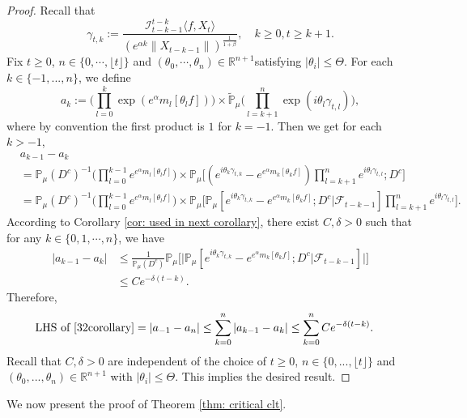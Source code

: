 \documentclass[12pt,a4paper]{amsart}
\theoremstyle{plain}
\theoremstyle{definition}
\numberwithin{equation}{section}
\begin{document}
\begin{proof}
    Recall that \[\gamma_{t,k}:=\frac {\mathcal I_{t-k-1}^{t-k}\langle f ,X_t\rangle}{(e^{\alpha k}\|X_{t-k-1}\|)^\frac{1}{1+\beta}},\quad k \geq 0, t\geq k+1. \]
    Fix $t\geq 0$, $n \in \{0, \cdots, \lfloor t \rfloor\}$ and $(\theta_0, \cdots, \theta_n)\in \mathbb R^{n+1}$satisfying $|\theta_i|\leq \Theta$.
    For each $k\in\{-1,...,n\}$, we define
\[
    a_k
    :=\Big(\prod_{l=0}^{k}\exp(e^{\alpha}m_l[\theta_lf])\Big) \times \mathbb{\tilde{P}}_{\mu}\Big(\prod_{l=k+1}^{n}\exp\left(i\theta_l\gamma_{t,l}\right)\Big),
\]
    where by convention the first product is $1$ for $k=-1$. Then we get for each $k > -1$,
\begin{align}
    &a_{k-1} - a_k
    \\&=\mathbb{P}_{\mu}(D^c)^{-1}\Big(\prod_{l=0}^{k-1}e^{e^{\alpha}m_l[\theta_l f]}\Big) \times \mathbb{P}_{\mu}\Big[(e^{i\theta_{k}\gamma_{t,k}}-e^{e^{\alpha}m_k[\theta_k f]})\prod_{l=k+1}^ne^{i\theta_{l}\gamma_{t,l}};D^c\Big]
    \\&=\mathbb{P}_{\mu}(D^c)^{-1} \Big(\prod_{l=0}^{k-1}e^{e^{\alpha}m_l[\theta_l f]}\Big) \times \mathbb{P}_{\mu}\Big[\mathbb P_\mu[e^{i\theta_{k}\gamma_{t,k}}-e^{e^{\alpha}m_k[\theta_k f]}; D^c|\mathscr F_{t-k-1}]\prod_{l=k+1}^ne^{i\theta_{l}\gamma_{t,l}}\Big].
\end{align}
    According to Corollary \ref{cor: used in next corollary}, there exist $C,\delta>0$ such that for any $k\in\{0, 1, \cdots, n\}$, we have
\begin{align}
    |a_{k-1}- a_k|
    &\leq \frac{1}{\mathbb{P}_{\mu}(D^c)}\mathbb{P}_{\mu}\Big[\big|\mathbb P_\mu[e^{i\theta_{k}\gamma_{t,k}}-e^{e^{\alpha}m_k[\theta_k f]}; D^c\big|\mathscr{F}_{t-k-1}]\big|\Big]
    \\& \leq C e^{-\delta(t-k)}.
\end{align}
    Therefore,
\begin{align}
    \text{LHS of \eqref{32corollary}}&= \left|a_{-1}-a_n\right|
    \leq\sum_{k=0}^n\left|a_{k-1}-a_k\right|
    \leq \sum_{k=0}^n C e^{-\delta(t-k)}.
\end{align}
	Recall that $C, \delta>0$ are independent of the choice of $t\geq 0$, $n \in \{0,...,\lfloor t \rfloor\}$ and $(\theta_0,...,\theta_n)\in \mathbb R^{n+1}$ with $|\theta_i|\leq \Theta$.
    This implies the desired result.
\end{proof}
    We now present the proof of Theorem \ref{thm: critical clt}.
\bigskip
\end{document}
